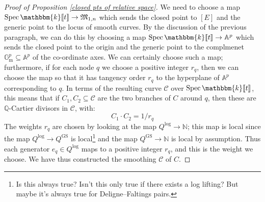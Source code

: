 \documentclass[11pt]{amsart}
\newcommand{\basenote}[1]{\footnote{\color{red}#1}}
\newcommand{\formLine}{\spec \mathbbm{k}\llbracket t \rrbracket}
\newcommand{\spec}{\operatorname{Spec}}
\newcommand{\N}{\mathbb{N}}
\renewcommand{\to}{\rightarrow}
\newcommand{\Aaff}{\mathbb{A}}
\newcommand{\Gm}{\mathbb{G}_{\text{m}}}
\newcommand{\QQ}{\mathbb{Q}}
\newcommand{\Ccal}{\mathcal{C}}
\newcommand{\Mfrak}{\mathfrak{M}}
\theoremstyle{definition}
\theoremstyle{definition}
\begin{document}
\begin{proof}[Proof of Proposition \ref{closed pts of relative space}]
We need to choose a map $\formLine \to \Mfrak_{1,n}$ which sends the closed point to $[E]$ and the generic point to the locus of smooth curves. By the discussion of the previous paragraph, we can do this by choosing a map $\formLine \to \Aaff^p$ which sends the closed point to the origin and the generic point to the complmenet $\Gm^p \subseteq \Aaff^p$ of the co-ordinate axes. We can certainly choose such a map; furthermore, if for each node $q$ we choose a positive integer $r_q$, then we can choose the map so that it has tangency order $r_q$ to the hyperplane of $\Aaff^p$ corresponding to $q$. In terms of the resulting curve $\Ccal$ over $\formLine$, this means that if $C_1, C_2 \subseteq \Ccal$ are the two branches of $C$ around $q$, then these are $\QQ$-Cartier divisors in $\Ccal$, with:
\begin{equation*} C_1 \cdot C_2 = 1/r_q \end{equation*}
The weights $r_q$ are chosen by looking at the map $Q^{\operatorname{log}} \to \N$; this map is local since the map $Q^{\operatorname{log}} \to Q^{\operatorname{GS}}$ is local\basenote{Is this always true? Isn't this only true if there exists a log lifting? But maybe it's always true for Deligne--Faltings pairs.} and the map $Q^{\operatorname{GS}} \to \N$ is local by assumption. Thus each generator $e_q \in Q^{\operatorname{log}}$ maps to a positive integer $r_q$, and this is the weight we choose. We have thus constructed the smoothing $\Ccal$ of $C$.


\end{proof}
\end{document}
